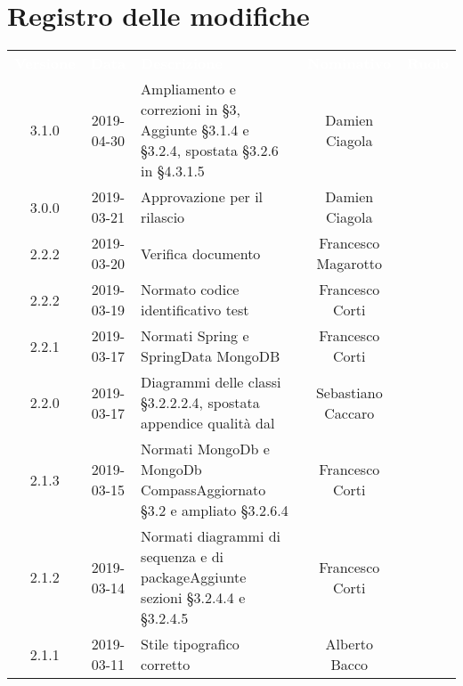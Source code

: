 
\section*{Registro delle modifiche}
{
	\renewcommand{\arraystretch}{1.5}
	\centering
	\begin{longtable}{ c c C{4cm} c c }
		
		\textcolor{white}{\textbf{Versione}} & \textcolor{white}{\textbf{Data}} & \textcolor{white}{\textbf{Descrizione}} & \textcolor{white}{\textbf{Nominativo}} & \textcolor{white}{\textbf{Ruolo}}\\
		
		3.1.0 & 2019-04-30 & Ampliamento e correzioni in §3, Aggiunte §3.1.4 e §3.2.4, spostata §3.2.6 in §4.3.1.5 & Damien Ciagola & \reda{} \\
		
	3.0.0 & 2019-03-21 & Approvazione per il rilascio & Damien Ciagola & \Res{} \\
			
	2.2.2 & 2019-03-20 & 
	Verifica documento & Francesco Magarotto & \ver{} \\	
		
		2.2.2 & 2019-03-19 & Normato codice identificativo test & Francesco Corti & \reda{} \\
		
		2.2.1 & 2019-03-17 & Normati Spring e SpringData MongoDB & Francesco Corti & \reda{} \\		
		
		2.2.0 & 2019-03-17 & Diagrammi delle classi §3.2.2.2.4, spostata appendice qualità dal \PdQ & Sebastiano Caccaro & \reda{} \\		
		
		2.1.3 & 2019-03-15 & Normati MongoDb e MongoDb Compass\newline Aggiornato §3.2 e ampliato §3.2.6.4 & Francesco Corti & \reda{} \\		
		
		2.1.2 & 2019-03-14 & Normati diagrammi di sequenza e di package\newline Aggiunte sezioni §3.2.4.4 e §3.2.4.5 & Francesco Corti & \reda{} \\	
		
		2.1.1 & 2019-03-11 & Stile tipografico corretto & Alberto Bacco & \reda{} \\	
		

\end{longtable}}
